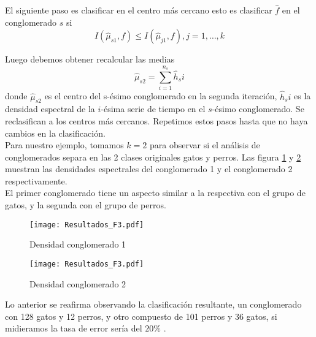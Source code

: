 \documentclass[twocolumn,10pt]{asme2ej}
\begin{document}
El siguiente paso es clasificar en el centro m\'as cercano esto es clasificar $\hat{f}$  en el conglomerado $s$ si 
$$I(\hat{\mu}_{s1}, f)\leq I(\hat{\mu}_{j1}, f), j=1,\dots,k$$

Luego debemos obtener recalcular las medias 
$$\hat{\mu}_{s2}=\sum_{i=1}^{n_s}\hat{h}_si$$
donde $\hat{\mu}_{s2}$ es el centro del s-\'esimo conglomerado en la segunda iteraci\'on, $\hat{h}_si$ es la densidad espectral de la $i$-\'esima serie de tiempo en el $s$-\'esimo conglomerado. Se reclasifican a los centros m\'as cercanos. Repetimos estos pasos hasta que no haya cambios en la clasificaci\'on.\\

Para nuestro ejemplo, tomamos $k=2$ para observar si el an\'alisis de conglomerados separa en las 2 clases originales gatos y perros. Las figura \ref{plot:espec_k1} y \ref{plot:espec_k2} muestran las densidades espectrales del conglomerado 1 y el conglomerado 2 respectivamente. \\

El primer conglomerado tiene un aspecto similar a la respectiva con el grupo de gatos, y la segunda con el grupo de perros. \\

\begin{figure}[h]
  \centering
    \texttt{[image: Resultados\_F3.pdf]}
  \caption{Densidad conglomerado 1}
  \label{plot:espec_k1}
\end{figure}
\begin{figure}[h]
  \centering
    \texttt{[image: Resultados\_F3.pdf]}
  \caption{Densidad conglomerado 2}
  \label{plot:espec_k2}
\end{figure}
Lo anterior se reafirma observando la clasificaci\'on resultante, un conglomerado con 128 gatos y 12 perros, y otro compuesto de 101 perros y 36 gatos, si midieramos la tasa de error ser\'ia del $20\%$ .





\end{document}
